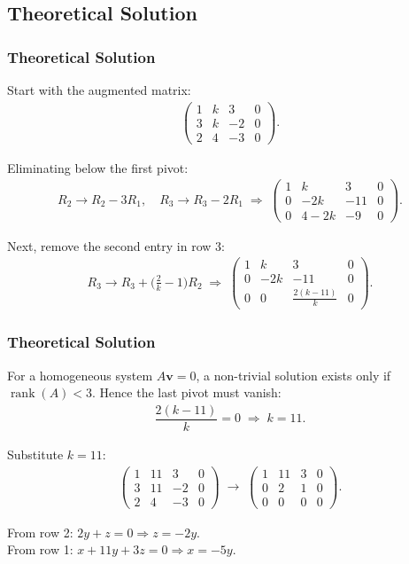 \documentclass{beamer}
\theoremstyle{remark}
\newcommand{\myvec}[1]{\ensuremath{\begin{pmatrix}#1\end{pmatrix}}}
\let\vec\mathbf
\numberwithin{equation}{section}
\begin{document}
\subsection{Theoretical Solution }
\begin{frame}
\frametitle{Theoretical Solution}
Start with the augmented matrix:
\begin{align}
\myvec{1 & k & 3 & 0 \\ 3 & k & -2 & 0 \\ 2 & 4 & -3 & 0}.
\end{align}

Eliminating below the first pivot:
\begin{align}
R_2 \to R_2 - 3R_1,\quad R_3 \to R_3 - 2R_1
\;\Rightarrow\;
\myvec{1 & k & 3 & 0 \\ 0 & -2k & -11 & 0 \\ 0 & 4-2k & -9 & 0}.
\end{align}

Next, remove the second entry in row 3:
\begin{align}
R_3 \to R_3 + \Big(\tfrac{2}{k}-1\Big)R_2
\;\Rightarrow\;
\myvec{1 & k & 3 & 0 \\ 0 & -2k & -11 & 0 \\ 0 & 0 & \tfrac{2(k-11)}{k} & 0}.
\end{align}

\end{frame}

\begin{frame}
\frametitle{Theoretical Solution}
For a homogeneous system $A\vec{v}=0$, a non-trivial solution exists only if $\operatorname{rank}(A)<3$.  
Hence the last pivot must vanish:
\begin{align}
\dfrac{2(k-11)}{k}=0 \;\Rightarrow\; k=11.
\end{align}

Substitute $k=11$:
\begin{align}
\myvec{1 & 11 & 3 & 0 \\ 3 & 11 & -2 & 0 \\ 2 & 4 & -3 & 0}
\;\longrightarrow\;
\myvec{1 & 11 & 3 & 0 \\ 0 & 2 & 1 & 0 \\ 0 & 0 & 0 & 0}.
\end{align}

From row 2: $2y+z=0 \Rightarrow z=-2y$.  \\
From row 1: $x+11y+3z=0 \Rightarrow x=-5y$.



\end{frame}
\end{document}
